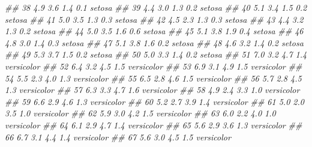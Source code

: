 \documentclass[
  13,
  letterpaper,
]{report}
\newenvironment{Shaded}{\begin{snugshade}}{\end{snugshade}}
\newcommand{\DocumentationTok}[1]{\textcolor[rgb]{0.37,0.37,0.37}{\textit{#1}}}
\begin{document}
\begin{Shaded}
\begin{Highlighting}[]
\DocumentationTok{\#\# 38           4.9         3.6          1.4         0.1     setosa}
\DocumentationTok{\#\# 39           4.4         3.0          1.3         0.2     setosa}
\DocumentationTok{\#\# 40           5.1         3.4          1.5         0.2     setosa}
\DocumentationTok{\#\# 41           5.0         3.5          1.3         0.3     setosa}
\DocumentationTok{\#\# 42           4.5         2.3          1.3         0.3     setosa}
\DocumentationTok{\#\# 43           4.4         3.2          1.3         0.2     setosa}
\DocumentationTok{\#\# 44           5.0         3.5          1.6         0.6     setosa}
\DocumentationTok{\#\# 45           5.1         3.8          1.9         0.4     setosa}
\DocumentationTok{\#\# 46           4.8         3.0          1.4         0.3     setosa}
\DocumentationTok{\#\# 47           5.1         3.8          1.6         0.2     setosa}
\DocumentationTok{\#\# 48           4.6         3.2          1.4         0.2     setosa}
\DocumentationTok{\#\# 49           5.3         3.7          1.5         0.2     setosa}
\DocumentationTok{\#\# 50           5.0         3.3          1.4         0.2     setosa}
\DocumentationTok{\#\# 51           7.0         3.2          4.7         1.4 versicolor}
\DocumentationTok{\#\# 52           6.4         3.2          4.5         1.5 versicolor}
\DocumentationTok{\#\# 53           6.9         3.1          4.9         1.5 versicolor}
\DocumentationTok{\#\# 54           5.5         2.3          4.0         1.3 versicolor}
\DocumentationTok{\#\# 55           6.5         2.8          4.6         1.5 versicolor}
\DocumentationTok{\#\# 56           5.7         2.8          4.5         1.3 versicolor}
\DocumentationTok{\#\# 57           6.3         3.3          4.7         1.6 versicolor}
\DocumentationTok{\#\# 58           4.9         2.4          3.3         1.0 versicolor}
\DocumentationTok{\#\# 59           6.6         2.9          4.6         1.3 versicolor}
\DocumentationTok{\#\# 60           5.2         2.7          3.9         1.4 versicolor}
\DocumentationTok{\#\# 61           5.0         2.0          3.5         1.0 versicolor}
\DocumentationTok{\#\# 62           5.9         3.0          4.2         1.5 versicolor}
\DocumentationTok{\#\# 63           6.0         2.2          4.0         1.0 versicolor}
\DocumentationTok{\#\# 64           6.1         2.9          4.7         1.4 versicolor}
\DocumentationTok{\#\# 65           5.6         2.9          3.6         1.3 versicolor}
\DocumentationTok{\#\# 66           6.7         3.1          4.4         1.4 versicolor}
\DocumentationTok{\#\# 67           5.6         3.0          4.5         1.5 versicolor}

\end{Highlighting}
\end{Shaded}
\end{document}
